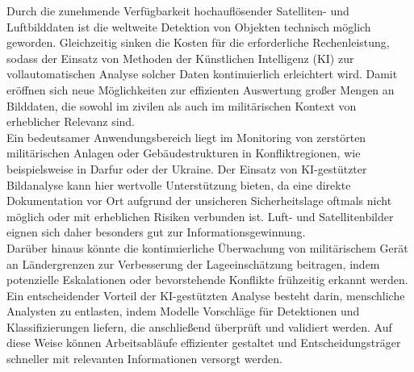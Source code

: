 

Durch die zunehmende Verfügbarkeit hochauflösender Satelliten- und Luftbilddaten ist die weltweite Detektion von Objekten technisch möglich geworden. Gleichzeitig sinken die Kosten für die erforderliche Rechenleistung, sodass der Einsatz von Methoden der Künstlichen Intelligenz (KI) zur vollautomatischen Analyse solcher Daten kontinuierlich erleichtert wird. Damit eröffnen sich neue Möglichkeiten zur effizienten Auswertung großer Mengen an Bilddaten, die sowohl im zivilen als auch im militärischen Kontext von erheblicher Relevanz sind. \\

Ein bedeutsamer Anwendungsbereich liegt im Monitoring von zerstörten militärischen Anlagen oder Gebäudestrukturen in Konfliktregionen, wie beispielsweise in Darfur \cite{Knoth2017} oder der Ukraine. Der Einsatz von KI-gestützter Bildanalyse kann hier wertvolle Unterstützung bieten, da eine direkte Dokumentation vor Ort aufgrund der unsicheren Sicherheitslage oftmals nicht möglich oder mit erheblichen Risiken verbunden ist. Luft- und Satellitenbilder eignen sich daher besonders gut zur Informationsgewinnung. \\

Darüber hinaus könnte die kontinuierliche Überwachung von militärischem Gerät an Ländergrenzen zur Verbesserung der Lageeinschätzung beitragen, indem potenzielle Eskalationen oder bevorstehende Konflikte frühzeitig erkannt werden. Ein entscheidender Vorteil der KI-gestützten Analyse besteht darin, menschliche Analysten zu entlasten, indem Modelle Vorschläge für Detektionen und Klassifizierungen liefern, die anschließend überprüft und validiert werden. Auf diese Weise können Arbeitsabläufe effizienter gestaltet und Entscheidungsträger schneller mit relevanten Informationen versorgt werden. \\

